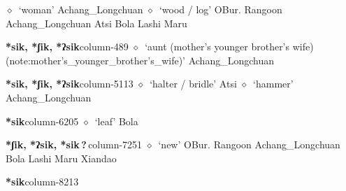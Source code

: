\hspace{1ex}
         $\diamond$~`woman'
         Achang\_Longchuan 
\hspace{1ex}
         $\diamond$~`wood / log'
         OBur. 
\hspace{1ex}
         Rangoon 
\hspace{1ex}
         Achang\_Longchuan 
\hspace{1ex}
         Atsi 
\hspace{1ex}
         Bola 
\hspace{1ex}
         Lashi 
\hspace{1ex}
         Maru 
  \item {\footnotesize \textbf{*sik, *ʃik, *ʔsik}}{\tiny column-489}
         $\diamond$~`aunt (mother's younger brother's wife) (note:mother's_younger_brother's_wife)'
         Achang\_Longchuan 
  \item {\footnotesize \textbf{*sik, *ʃik, *ʔsik}}{\tiny column-5113}
         $\diamond$~`halter / bridle'
         Atsi 
\hspace{1ex}
         $\diamond$~`hammer'
         Achang\_Longchuan 
  \item {\footnotesize \textbf{*sik}}{\tiny column-6205}
         $\diamond$~`leaf'
         Bola 
  \item {\footnotesize \textbf{*ʃik, *ʔsik, *sik\,?\,}}{\tiny column-7251}
         $\diamond$~`new'
         OBur. 
\hspace{1ex}
         Rangoon 
\hspace{1ex}
         Achang\_Longchuan 
\hspace{1ex}
         Bola 
\hspace{1ex}
         Lashi 
\hspace{1ex}
         Maru 
\hspace{1ex}
         Xiandao 
  \item {\footnotesize \textbf{*sik}}{\tiny column-8213}
